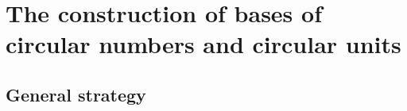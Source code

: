 \chapter{The construction of bases of circular numbers and circular units}

\section{General strategy}





